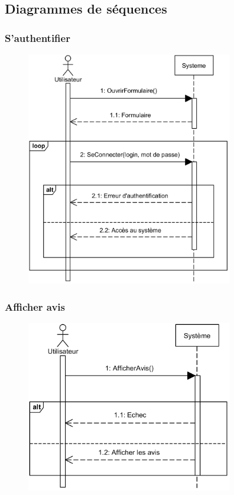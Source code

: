 \subsection[Diagrammes de séquences]{Diagrammes de séquences}
    \subsubsection[S’authentifier]{S’authentifier}
        \begin{figure}[H]
            \centering
            \includegraphics[width=90mm]{images/diagramme-de-sequence/sd-auth.png}
            \label{fig:sdAuthentifier}
        \end{figure}
    \subsubsection[Afficher avis]{Afficher avis}
        \begin{figure}[H]
            \centering
            \includegraphics[width=90mm]{images/diagramme-de-sequence/sd-afficher-avis.png}
            \label{fig:sdAffavis}
        \end{figure}
\pagebreak
